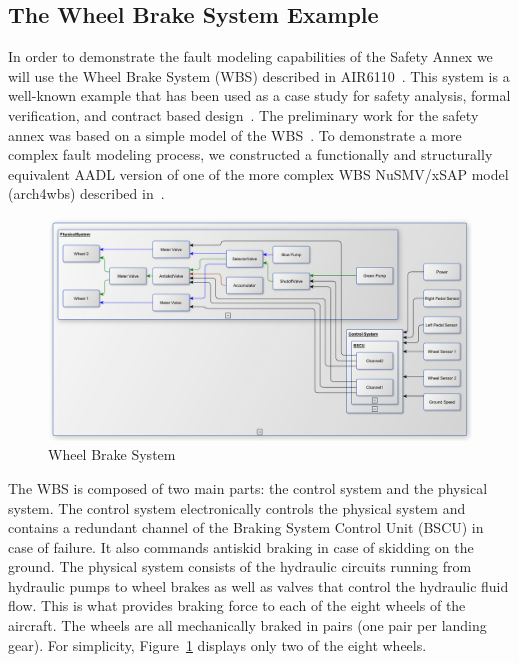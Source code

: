 
 \subsection{The Wheel Brake System Example}
\label{sec:case_study} 

In order to demonstrate the fault modeling capabilities of the Safety Annex we will use the Wheel Brake System (WBS) described in AIR6110~\cite{AIR6110}.  This system is a well-known example that has been used as a case study for safety analysis, formal verification, and contract based design~\cite{DBLP:conf/cav/BozzanoCPJKPRT15, 10.1007/978-3-319-11936-6-7, CAV2015:BoCiGrMa, Joshi05:SafeComp}. The preliminary work for the safety annex was based on a simple model of the WBS~\cite{Stewart17:IMBSA}. To demonstrate a more complex fault modeling process, we constructed a functionally and structurally equivalent AADL version of one of the more complex WBS NuSMV/xSAP model (arch4wbs) described in~\cite{DBLP:conf/cav/BozzanoCPJKPRT15}.    

\begin{figure}[h!]
	\centering
	\includegraphics[trim=0 9 0 5,clip,width=\textwidth]{images/wbs_arch.pdf}
	\caption{Wheel Brake System} 
	\label{fig:wbs}
\end{figure} 

The WBS is composed of two main parts: the control system and the physical system. The control system electronically controls the physical system and contains a redundant channel of the Braking System Control Unit (BSCU) in case of failure. It also commands antiskid braking in case of skidding on the ground. The physical system consists of the hydraulic circuits running from hydraulic pumps to wheel brakes as well as valves that control the hydraulic fluid flow. This is what provides braking force to each of the eight wheels of the aircraft. The wheels are all mechanically braked in pairs (one pair per landing gear). For simplicity, Figure~\ref{fig:wbs} displays only two of the eight wheels. 

